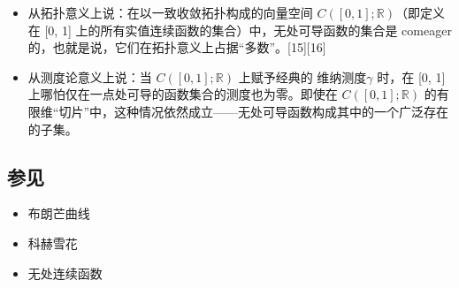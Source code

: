 \begin{itemize}
\item 从拓扑意义上说：在以一致收敛拓扑构成的向量空间 $C([0, 1]; \mathbb{R})$（即定义在 [0, 1] 上的所有实值连续函数的集合）中，无处可导函数的集合是 comeager 的，也就是说，它们在拓扑意义上占据“多数”。[15][16]
\item 从测度论意义上说：当 $C([0, 1]; \mathbb{R})$ 上赋予经典的 维纳测度$\gamma$ 时，在 [0, 1] 上哪怕仅在一点处可导的函数集合的测度也为零。即使在 $C([0, 1]; \mathbb{R})$ 的有限维“切片”中，这种情况依然成立——无处可导函数构成其中的一个广泛存在的子集。
\end{itemize}
\subsection{参见}
\begin{itemize}
\item 布朗芒曲线
\item 科赫雪花
\item 无处连续函数
\end{itemize}